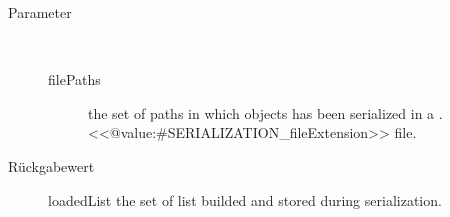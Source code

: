 \begin{description}
\begin{description}
\item[Parameter] ~
\begin{description}
\item[filePaths]
the set of paths in which objects has been serialized in a .<<@value:#SERIALIZATION_fileExtension>> file.
\end{description}
\item[Rückgabewert] 
loadedList the set of list builded and stored during serialization.
\end{description}
\item[{\ltdHypertarget{ontologyFramework.OFRunning.OFSerializator.rebuildScheduler(ontologyFramework.OFRunning.OFInvokingManager.OFBuildedListInvoker)}{rebuildScheduler}\label{ontologyFramework.OFRunning.OFSerializator.rebuildScheduler(ontologyFramework.OFRunning.OFInvokingManager.OFBuildedListInvoker)}}]
~ 
\end{description}
